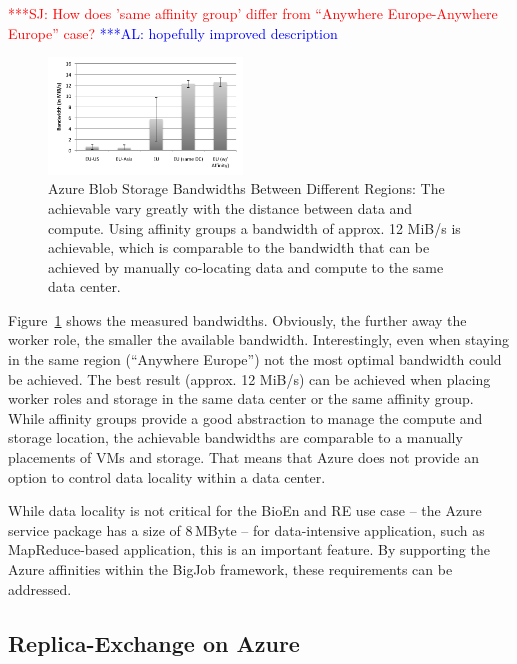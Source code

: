 \documentclass[conference,final]{IEEEtran}
\newcommand{\alnote}[1]{ {\textcolor{blue} { ***AL: #1 }}}
\newcommand{\jhanote}[1]{ {\textcolor{red} { ***SJ: #1 }}}
\newcommand{\alnote}[1]{}
\newcommand{\jhanote}[1]{}
\begin{document}
\jhanote{How does 'same affinity group' differ from ``Anywhere
  Europe-Anywhere Europe'' case?}\alnote{hopefully improved description}

\begin{figure}[htbp]
    \centering
        \includegraphics[width=0.46\textwidth]{performance/azure-data-transfer.pdf}
    \caption{Azure Blob Storage Bandwidths Between Different Regions: The achievable vary
    greatly with the distance between data and compute. Using affinity groups a bandwidth
    of approx. 12 MiB/s is achievable, which is comparable to the bandwidth that can
    be achieved by manually co-locating data and compute to the same data center.
    }
    \label{fig:performance_azure-data-transfer}
\end{figure}
Figure~\ref{fig:performance_azure-data-transfer} shows the measured
bandwidths. Obviously, the further away the worker role, the smaller
the available bandwidth. Interestingly, even when staying in the same
region (``Anywhere Europe'') not the most optimal bandwidth could be
achieved. The best result (approx. 12 MiB/s) can be achieved when
placing worker roles and storage in the same data center or the 
same affinity group. While affinity groups provide a good abstraction
to manage the compute and storage location, the achievable bandwidths
are comparable to a manually placements of VMs and storage. That means 
that Azure does not provide an option to control data locality within
a data center.

While data locality is not critical for the BioEn and RE use case --
the Azure service package has a size of 8\,MByte -- for data-intensive
application, such as MapReduce-based application, this is an important
feature. By supporting the Azure affinities within the BigJob framework,
these requirements can be addressed.

\subsection{Replica-Exchange on Azure}
\end{document}
